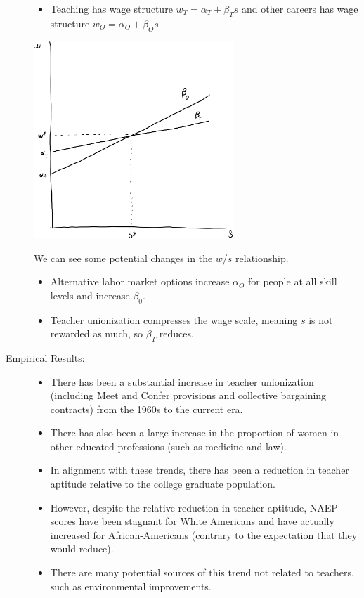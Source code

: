 \documentclass[10pt]{extarticle}
\begin{document}
\begin{description}
\begin{itemize}
        \item Teaching has wage structure $w_T= \alpha_T + \beta_T s$ and other careers has wage structure $w_O = \alpha_O + \beta_O s$
      \end{itemize}
      \begin{center}
        \includegraphics[width=7.5cm]{images/returns_to_skill_teachers.png}
      \end{center}
      We can see some potential changes in the $w$/$s$ relationship.
      \begin{itemize}
        \item Alternative labor market options increase $\alpha_O$ for people at all skill levels and increase $\beta_0$.
        \item Teacher unionization compresses the wage scale, meaning $s$ is not rewarded as much, so $\beta_T$ reduces.
      \end{itemize}
    \item[Empirical Results:]\hfill
      \begin{itemize}
        \item There has been a substantial increase in teacher unionization (including Meet and Confer provisions and collective bargaining contracts) from the 1960s to the current era.
        \item There has also been a large increase in the proportion of women in other educated professions (such as medicine and law).
        \item In alignment with these trends, there has been a reduction in teacher aptitude relative to the college graduate population.
        \item However, despite the relative reduction in teacher aptitude, NAEP scores have been stagnant for White Americans and have actually increased for African-Americans (contrary to the expectation that they would reduce).
        \item There are many potential sources of this trend not related to teachers, such as environmental improvements.
      \end{itemize}
  \end{description}
\end{document}
